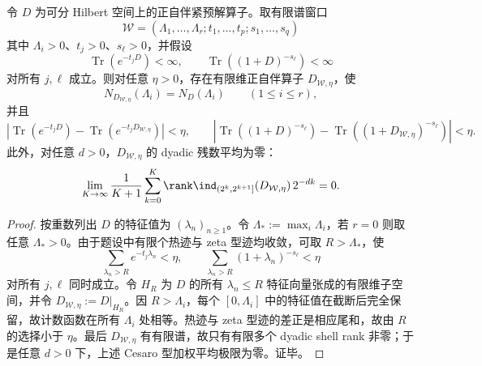 \begin{proposition}[有限谱窗口的尾部抹除正规形]\label{distill:connes_spectral_triples_and_chamseddine_connes_spectral_action-spectral_dimension_and_volume_family-finite-window-tail-erasure-normal-form}
令 \(D\) 为可分 Hilbert 空间上的正自伴紧预解算子。取有限谱窗口
\[
\mathcal W=(\Lambda_1,\dots,\Lambda_r;t_1,\dots,t_p;s_1,\dots,s_q)
\]
其中 \(\Lambda_i>0\)、\(t_j>0\)、\(s_\ell>0\)，并假设
\[
\operatorname{Tr}(e^{-t_jD})<\infty,\qquad
\operatorname{Tr}((1+D)^{-s_\ell})<\infty
\]
对所有 \(j,\ell\) 成立。则对任意 \(\eta>0\)，存在有限维正自伴算子 \(D_{\mathcal W,\eta}\)，使
\[
N_{D_{\mathcal W,\eta}}(\Lambda_i)=N_D(\Lambda_i)\qquad(1\le i\le r),
\]
并且
\[
\left|\operatorname{Tr}(e^{-t_jD})-\operatorname{Tr}(e^{-t_jD_{\mathcal W,\eta}})\right|<\eta,\qquad
\left|\operatorname{Tr}((1+D)^{-s_\ell})-\operatorname{Tr}((1+D_{\mathcal W,\eta})^{-s_\ell})\right|<\eta.
\]
此外，对任意 \(d>0\)，\(D_{\mathcal W,\eta}\) 的 dyadic 残数平均为零：
\[
\lim_{K\to\infty}\frac{1}{K+1}\sum_{k=0}^{K}\rank\ind_{(2^k,2^{k+1}]}(D_{\mathcal W,\eta})\,2^{-dk}=0.
\]
\end{proposition}
\begin{proof}
按重数列出 \(D\) 的特征值为 \((\lambda_n)_{n\ge1}\)。令 \(\Lambda_*:=\max_i\Lambda_i\)，若 \(r=0\) 则取任意 \(\Lambda_*>0\)。由于题设中有限个热迹与 zeta 型迹均收敛，可取 \(R>\Lambda_*\)，使
\[
\sum_{\lambda_n>R}e^{-t_j\lambda_n}<\eta,\qquad
\sum_{\lambda_n>R}(1+\lambda_n)^{-s_\ell}<\eta
\]
对所有 \(j,\ell\) 同时成立。令 \(H_R\) 为 \(D\) 的所有 \(\lambda_n\le R\) 特征向量张成的有限维子空间，并令 \(D_{\mathcal W,\eta}:=D|_{H_R}\)。因 \(R>\Lambda_i\)，每个 \([0,\Lambda_i]\) 中的特征值在截断后完全保留，故计数函数在所有 \(\Lambda_i\) 处相等。热迹与 zeta 型迹的差正是相应尾和，故由 \(R\) 的选择小于 \(\eta\)。最后 \(D_{\mathcal W,\eta}\) 有有限谱，故只有有限多个 dyadic shell rank 非零；于是任意 \(d>0\) 下，上述 Cesaro 型加权平均极限为零。证毕。
\end{proof}

\endinput

